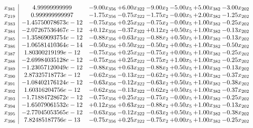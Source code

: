 \documentclass[8pt]{article}
\begin{document}
\[\begin{array}{c| c c@{\hskip 2pt} c@{\hskip 2pt} c@{\hskip 2pt} c@{\hskip 2pt} c@{\hskip 2pt} c@{\hskip 2pt} }
 x_{381}   &  4.99999999999 & -9.00 x_{356} & +  6.00 x_{322} & -9.00 x_{2} & -5.00 x_{5} & +  5.00 x_{382} & -3.00 x_{202}\\
 x_{219}   &  0.999999999997 & -1.75 x_{356} & -0.75 x_{322} & -1.75 x_{2} & -0.00 x_{5} & +  2.00 x_{382} & -1.25 x_{202}\\
 x_{383}   &  -1.45750078673e-12 & -0.75 x_{356} & +  0.25 x_{322} & -0.75 x_{2} & -0.00 x_{5} & +  1.00 x_{382} & -0.25 x_{202}\\
 x_{384}   &  -2.07267536467e-12 & +  0.12 x_{356} & -0.37 x_{322} & +  0.12 x_{2} & +  0.50 x_{5} & +  1.00 x_{382} & -0.13 x_{202}\\
 x_{385}   &  -1.35869093754e-12 & -0.88 x_{356} & +  0.63 x_{322} & -0.88 x_{2} & +  0.50 x_{5} & +  1.00 x_{382} & -0.13 x_{202}\\
 x_{386}   &  -1.06581410364e-14 & -0.50 x_{356} & +  0.50 x_{322} & -0.50 x_{2} & +  0.00 x_{5} & +  1.00 x_{382} & -0.50 x_{202}\\
 x_{387}   &  1.80300219199e-12 & -0.75 x_{356} & +  0.25 x_{322} & -0.75 x_{2} & +  0.00 x_{5} & +  1.00 x_{382} & -0.25 x_{202}\\
 x_{388}   &  -2.69984035128e-12 & -0.75 x_{356} & +  0.25 x_{322} & -0.75 x_{2} & +  1.00 x_{5} & +  1.00 x_{382} & -0.25 x_{202}\\
 x_{389}   &  -1.23057120049e-12 & -0.88 x_{356} & +  0.63 x_{322} & -0.88 x_{2} & +  0.50 x_{5} & +  1.00 x_{382} & -0.13 x_{202}\\
 x_{390}   &  2.87325718773e-12 & -0.62 x_{356} & -0.13 x_{322} & -0.62 x_{2} & +  0.50 x_{5} & +  1.00 x_{382} & -0.37 x_{202}\\
 x_{391}   &  -1.08402176124e-12 & -0.63 x_{356} & -0.12 x_{322} & -0.63 x_{2} & +  0.50 x_{5} & +  1.00 x_{382} & -0.38 x_{202}\\
 x_{392}   &  1.60316204756e-12 & -0.62 x_{356} & -0.13 x_{322} & -0.62 x_{2} & +  0.50 x_{5} & +  1.00 x_{382} & -0.37 x_{202}\\
 x_{393}   &  -1.71884728672e-12 & -0.75 x_{356} & +  0.25 x_{322} & -0.75 x_{2} & -0.00 x_{5} & +  1.00 x_{382} & -0.25 x_{202}\\
 x_{394}   &  -1.65079061532e-12 & +  0.12 x_{356} & +  0.63 x_{322} & -0.88 x_{2} & +  0.50 x_{5} & +  1.00 x_{382} & -0.13 x_{202}\\
 x_{395}   &  -2.77045053565e-12 & -0.63 x_{356} & -0.12 x_{322} & -0.63 x_{2} & +  0.50 x_{5} & +  1.00 x_{382} & -0.38 x_{202}\\
 x_{396}   &  7.82485187756e-13 & -0.75 x_{356} & +  0.25 x_{322} & -0.75 x_{2} & +  0.00 x_{5} & +  1.00 x_{382} & -0.25 x_{202}\\

\end{array}\]
\end{document}
